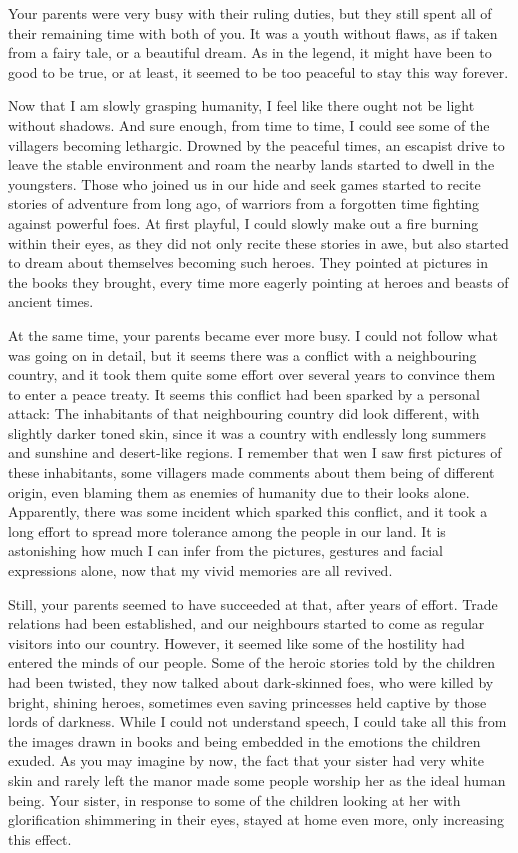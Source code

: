 Your parents were very busy with their ruling duties, but they still spent all of their remaining time with both of you. It was a youth without flaws, as if taken from a fairy tale, or a beautiful dream. As in the legend, it might have been to good to be true, or at least, it seemed to be too peaceful to stay this way forever.

Now that I am slowly grasping humanity, I feel like there ought not be light without shadows. And sure enough, from time to time, I could see some of the villagers becoming lethargic. Drowned by the peaceful times, an escapist drive to leave the stable environment and roam the nearby lands started to dwell in the youngsters. Those who joined us in our hide and seek games started to recite stories of adventure from long ago, of warriors from a forgotten time fighting against powerful foes. At first playful, I could slowly make out a fire burning within their eyes, as they did not only recite these stories in awe, but also started to dream about themselves becoming such heroes. They pointed at pictures in the books they brought, every time more eagerly pointing at heroes and beasts of ancient times. 

At the same time, your parents became ever more busy. I could not follow what was going on in detail, but it seems there was a conflict with a neighbouring country, and it took them quite some effort over several years to convince them to enter a peace treaty. It seems this conflict had been sparked by a personal attack: The inhabitants of that neighbouring country did look different, with slightly darker toned skin, since it was a country with endlessly long summers and sunshine and desert-like regions. I remember that wen I saw first pictures of these inhabitants, some villagers made comments about them being of different origin, even blaming them as enemies of humanity due to their looks alone. Apparently, there was some incident which sparked this conflict, and it took a long effort to spread more tolerance among the people in our land. It is astonishing how much I can infer from the pictures, gestures and facial expressions alone, now that my vivid memories are all revived.

Still, your parents seemed to have succeeded at that, after years of effort. Trade relations had been established, and our neighbours started to come as regular visitors into our country. However, it seemed like some of the hostility had entered the minds of our people. Some of the heroic stories told by the children had been twisted, they now talked about dark-skinned foes, who were killed by bright, shining heroes, sometimes even saving princesses held captive by those lords of darkness. While I could not understand speech, I could take all this from the images drawn in books and being embedded in the emotions the children exuded. As you may imagine by now, the fact that your sister had very white skin and rarely left the manor made some people worship her as the ideal human being. Your sister, in response to some of the children looking at her with glorification shimmering in their eyes, stayed at home even more, only increasing this effect. 

